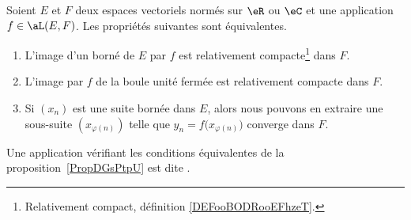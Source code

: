 \begin{propositionDef} \label{PropDGsPtpU}
	Soient \( E\) et \( F\) deux espaces vectoriels normés sur \( \eR\) ou \( \eC\) et une application \( f\in\aL(E,F)\). Les propriétés suivantes sont équivalentes.
	\begin{enumerate}
		\item       \label{ITEMooAFNXooUGbZsh}
		      L'image d'un borné de \( E\) par \( f\) est relativement compacte\footnote{Relativement compact, définition \ref{DEFooBODRooEFhzeT}.} dans \( F\).
		\item   \label{ItemJIkpUbLii}
		      L'image par \( f\) de la boule unité fermée est relativement compacte dans \( F\).
		\item   \label{ITEMooQKISooBpyyee}
		      Si \( (x_n)\) est une suite bornée dans \( E\), alors nous pouvons en extraire une sous-suite \( (x_{\varphi(n)})\) telle que
		      \( y_n = f\big( x_{\varphi(n)} \big)\) converge dans \( F\).
	\end{enumerate}
	Une application vérifiant les conditions équivalentes de la proposition~\ref{PropDGsPtpU} est dite .
\end{propositionDef}


